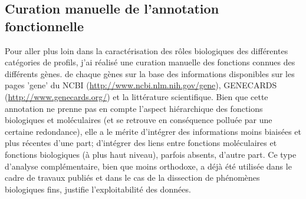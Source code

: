 \documentclass[../main.tex]{subfiles}
\begin{document}
\subsection{Curation manuelle de l'annotation fonctionnelle}\label{subsec:manual-annot}
Pour aller plus loin dans la caractérisation des rôles biologiques des différentes catégories de profils, j'ai réalisé une curation manuelle des fonctions connues des différents gènes. de chaque gènes sur la base des informations disponibles sur les pages 'gene' du NCBI (\url{http://www.ncbi.nlm.nih.gov/gene}), GENECARDS (\url{http://www.genecards.org/}) et la littérature scientifique.
Bien que cette annotation ne prenne pas en compte l'aspect hiérarchique des fonctions biologiques et moléculaires (et se retrouve en conséquence polluée par une certaine redondance), elle a le mérite d'intégrer des informations moins biaisées et plus récentes d'une part; d'intégrer des liens entre fonctions moléculaires et fonctions biologiques (à plus haut niveau), parfois absents, d'autre part.
Ce type d'analyse complémentaire, bien que moins orthodoxe, a déjà été utilisée dans le cadre de travaux publiés \citep{Hendrix2008} et dans le cas de la dissection de phénomènes biologiques fins, justifie l'exploitabilité des données.
\end{document}
